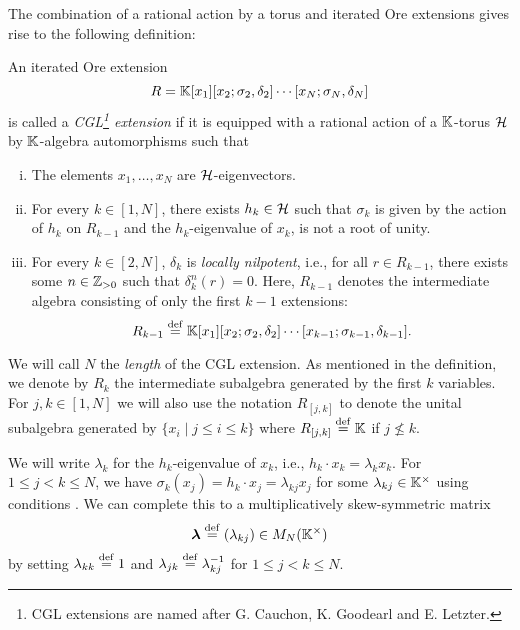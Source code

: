 The combination of a rational action by a torus and iterated Ore extensions gives rise
to the following definition:
\begin{definition}\label{def:cgl_extension}
	An iterated Ore extension
	\begin{equation*}
		R = \mathbb{K}[x_1][x_2; \sigma_2, \delta_2]\cdots [x_N; \sigma_N, \delta_N]
	\end{equation*}
	is called a \emph{CGL\footnote{CGL extensions are named after G. Cauchon, K. Goodearl
			and E. Letzter.} extension} if it is equipped with a rational
	action of a $\mathbb{K}$-torus $\mathcal{H}$ by $\mathbb{K}$-algebra automorphisms such that
	\begin{enumerate}[(i)]
		\item\label{itm:x_i-eigenvectors} The elements $x_1, \dots, x_N$ are $\mathcal{H}$-eigenvectors.
		\item\label{itm:sigma_k-is-h_k} For every $k \in [1, N]$, there exists $h_k \in \mathcal{H}$ such that $\sigma_k$ is given by the action of $h_k$ on $R_{k-1}$ and the $h_k$-eigenvalue of $x_k$, is not a root of unity.
		\item For every $k\in [2, N]$, $\delta_k$ is \emph{locally
			      nilpotent}, i.e., for all $r \in R_{k-1}$, there exists some
		      $n \in \mathbb{Z}_{>0}$ such that $\delta_k^n (r) = 0$. Here, $R_{k-1}$ denotes the
		      intermediate algebra consisting of only the first $k-1$ extensions:
		      \begin{equation*}
			      R_{k-1} \overset{\mathrm{def}}{=} \mathbb{K}[x_1][x_2; \sigma_2, \delta_2]\cdots[x_{k-1};\sigma_{k-1}, \delta_{k-1}].
		      \end{equation*}
	\end{enumerate}
\end{definition}

We will call $N$ the \emph{length} of the CGL extension.
As mentioned in the definition, we denote by $R_k$ the intermediate
subalgebra generated by the first $k$ variables. For $j, k \in [1, N]$ we will also use
the notation $R_{[j, k]}$ to denote the unital subalgebra
generated by $\{x_i \mid j \leq i \leq k\}$ where $R_{[j, k]} \overset{\mathrm{def}}{=} \mathbb{K}$ if $j \nleq
	k$.

We will write $\lambda_k$ for the $h_k$-eigenvalue of $x_k$, i.e., $h_k \cdot x_k =
	\lambda_k x_k$. For $1 \leq j < k \leq N$, we have
$\sigma_k (x_j) = h_k \cdot x_j = \lambda_{kj} x_j$ for some $\lambda_{kj} \in
	\mathbb{K}^\times$ using conditions . We
can complete this to a multiplicatively skew-symmetric matrix
\begin{equation}\label{eq:CGL_lambda}
	\boldsymbol{\lambda} \overset{\mathrm{def}}{=} (\lambda_{kj}) \in M_N(\mathbb{K}^\times)
\end{equation}
%
 by setting $\lambda_{kk} \overset{\mathrm{def}}{=} 1$ and $\lambda_{jk} \overset{\mathrm{def}}{=} \lambda_{kj}^{-1}$ for $1 \leq j < k
	\leq N$.

